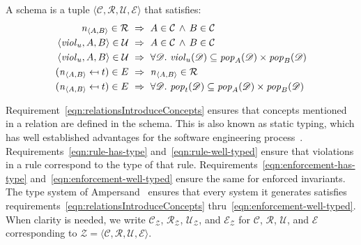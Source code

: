 \documentclass[runningheads]{llncs}
\newcommand{\id}[1]{\text{\it #1\/}}
\newcommand{\popF}[1]{\id{pop}_{#1}}
\newcommand{\pop}[2]{\popF{#1}(#2)}
\newcommand{\viol}[2]{\violC{#1}(#2)}
\newcommand{\violC}[1]{\id{viol}_{#1}}
\newcommand{\declare}[3]{\id{#1}_{\pair{#2}{#3}}}
\newcommand{\pair}[2]{\langle{#1},{#2}\rangle}
\newcommand{\Pair}[2]{#1\times#2}
\newcommand{\triple}[3]{\langle{#1},{#2},{#3}\rangle}
\newcommand{\quadruple}[4]{\langle{#1},{#2},{#3},{#4}\rangle}
\newcommand{\concepts}{\mathcal{C}}
\newcommand{\rels}{\mathcal{R}}   %
\newcommand{\enforces}{\mathcal{E}}
\newcommand{\rules}{\mathcal{U}}
\newcommand{\dataset}{\mathscr{D}}
\newcommand{\schema}{\mathscr{Z}}
\begin{document}
   \begin{definition}[Schema]
   A schema is a tuple $\quadruple{\concepts}{\rels}{\rules}{\enforces}$ that satisfies:
\begin{align}
   \declare{n}{A}{B}\in\rels&~\Rightarrow~ A\in\concepts\,\wedge\, B\in\concepts
   \label{eqn:relationsIntroduceConcepts}\\
   \triple{\violC{u}}{A}{B}\in\rules&~\Rightarrow~A\in\concepts\,\wedge\, B\in\concepts\label{eqn:rule-has-type}\\
   \triple{\violC{u}}{A}{B}\in\rules&~\Rightarrow~\forall\dataset.\ \viol{u}{\dataset}\subseteq\Pair{\pop{A}{\dataset}}{\pop{B}{\dataset}}\label{eqn:rule-well-typed}\\
   (\declare{n}{A}{B}\mapsfrom t)\in\mathcal\enforces&~\Rightarrow~ \declare{n}{A}{B}\in \rels\label{eqn:enforcement-has-type}\\
   (\declare{n}{A}{B}\mapsfrom t)\in\mathcal\enforces&~\Rightarrow~\forall\dataset.\ \pop{t}{\dataset}\subseteq\Pair{\pop{A}{\dataset}}{\pop{B}{\dataset}}\label{eqn:enforcement-well-typed}
\end{align}
   \end{definition}
   Requirement~\ref{eqn:relationsIntroduceConcepts} ensures that concepts mentioned in a relation are defined in the schema.
   This is also known as static typing, which has well established advantages for the software engineering process~\cite{HanenbergKRTS14,Petersen2014}.
   Requirements~\ref{eqn:rule-has-type} and~\ref{eqn:rule-well-typed} ensure that violations in a rule correspond to the type of that rule. 
   Requirements~\ref{eqn:enforcement-has-type} and~\ref{eqn:enforcement-well-typed} ensure the same for enforced invariants. 
   The type system of Ampersand~\cite{vdWoude2011} ensures that every system it generates satisfies requirements~\ref{eqn:relationsIntroduceConcepts} thru~\ref{eqn:enforcement-well-typed}.
   When clarity is needed, we write $\concepts_{\schema}$, $\rels_{\schema}$, $\rules_{\schema}$, and $\enforces_{\schema}$
   for $\concepts$, $\rels$, $\rules$, and $\enforces$ corresponding to $\schema = \quadruple{\concepts}{\rels}{\rules}{\enforces}$.
\end{document}
